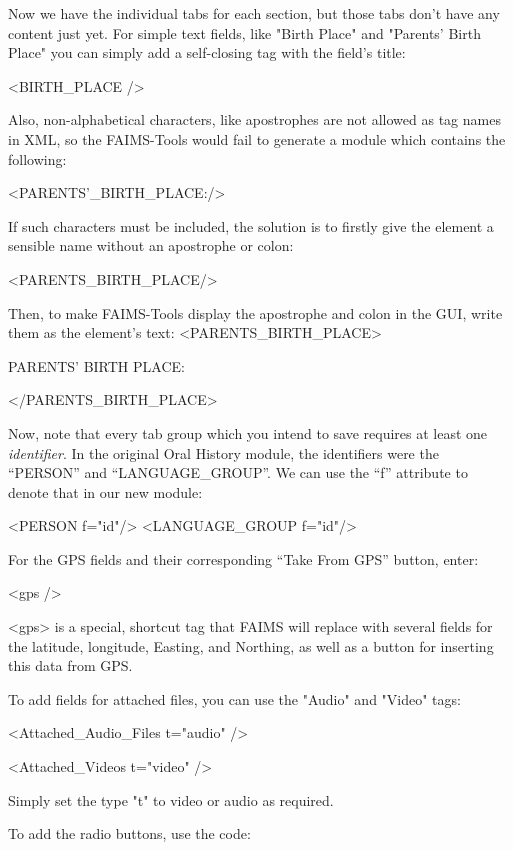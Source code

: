 Now we have the individual tabs for each section, but those tabs don't have any content just yet. For simple text fields, like "Birth Place" and "Parents' Birth Place" you can simply add a self-closing tag with the field's title:

<BIRTH_PLACE />

Also, non-alphabetical characters, like apostrophes are not allowed as tag names in XML, so the FAIMS-Tools would fail to generate a module which contains the following:

<PARENTS'_BIRTH_PLACE:/>

If such characters must be included, the solution is to firstly give the element a sensible name without an apostrophe or colon:

<PARENTS_BIRTH_PLACE/>

Then, to make FAIMS-Tools display the apostrophe and colon in the GUI, write them as the element's text:\crlf
\crlf
<PARENTS_BIRTH_PLACE>

PARENTS' BIRTH PLACE:

</PARENTS_BIRTH_PLACE>

Now, note that every tab group which you intend to save requires at least one {\em identifier}. In the original Oral History module, the identifiers were the “PERSON” and “LANGUAGE_GROUP”. We can use the “f” attribute to denote that in our new module:

<PERSON f="id"/>\crlf
<LANGUAGE_GROUP f="id"/>

For the GPS fields and their corresponding “Take From GPS” button, enter:

<gps />

<gps> is a special, shortcut tag that FAIMS will replace with several fields for the latitude, longitude, Easting, and Northing, as well as a button for inserting this data from GPS.

To add fields for attached files, you can use the "Audio" and "Video" tags:

<Attached_Audio_Files t="audio" />

<Attached_Videos t="video" />

Simply set the type "t" to video or audio as required.

{}{}{}

To add the radio buttons, use the code:

